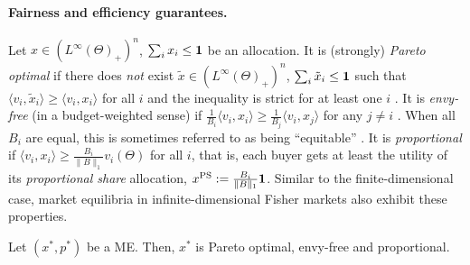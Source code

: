 
\paragraph{Fairness and efficiency guarantees.} 
Let $x\in (L^\infty(\Theta)_+)^n$, $\sum_i x_i \leq \mathbf{1}$ be an allocation. It is (strongly) \emph{Pareto optimal} if there does \emph{not} exist $\tilde{x}\in (L^\infty(\Theta)_+)^n$, $\sum_i \tilde{x}_i \leq \mathbf{1}$ such that $\langle v_i, \tilde{x}_i \rangle \geq \langle v_i, x_i \rangle$ for all $i$ and the inequality is strict for at least one $i$ \citep{cohler2011optimal}. 
It is \emph{envy-free} (in a budget-weighted sense) if 
$\frac{1}{B_i}\langle v_i, x_i \rangle \geq \frac{1}{B_j}\langle v_i, x_j\rangle$
for any $j\neq i$ \citep{nisan2007algorithmic,kroer2019computing}. 
When all $B_i$ are equal, this is sometimes referred to as being ``equitable'' \citep{weller1985fair}. 
It is \emph{proportional} if $\langle v_i, x_i \rangle \geq \frac{B_i}{\|B\|_1} v_i(\Theta)$ for all $i$, that is, each buyer gets at least the utility of its \emph{proportional share} allocation, 
$x^{\rm PS} := \frac{B_i}{\|B\|_1} \mathbf{1}$. 
Similar to the finite-dimensional case, market equilibria in infinite-dimensional Fisher markets also exhibit these properties.
\begin{theorem}
	Let $(x^*, p^*)$ be a ME. Then, $x^*$ is Pareto optimal, envy-free and proportional. \label{thm:me-is-pareto-ef-prop}
\end{theorem}


